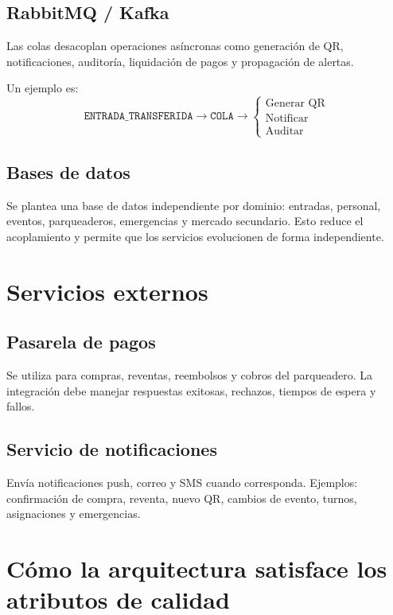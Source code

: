 \documentclass[12pt,a4paper]{article}
\begin{document}
\subsection{RabbitMQ / Kafka}

Las colas desacoplan operaciones asíncronas como generación de QR, notificaciones, auditoría, liquidación de pagos y propagación de alertas.

Un ejemplo es:
\[
\texttt{ENTRADA\_TRANSFERIDA}
\rightarrow
\texttt{COLA}
\rightarrow
\begin{cases}
\text{Generar QR}\\
\text{Notificar}\\
\text{Auditar}
\end{cases}
\]

\subsection{Bases de datos}

Se plantea una base de datos independiente por dominio: entradas, personal, eventos, parqueaderos, emergencias y mercado secundario. Esto reduce el acoplamiento y permite que los servicios evolucionen de forma independiente.

\section{Servicios externos}

\subsection{Pasarela de pagos}

Se utiliza para compras, reventas, reembolsos y cobros del parqueadero. La integración debe manejar respuestas exitosas, rechazos, tiempos de espera y fallos.

\subsection{Servicio de notificaciones}

Envía notificaciones push, correo y SMS cuando corresponda. Ejemplos: confirmación de compra, reventa, nuevo QR, cambios de evento, turnos, asignaciones y emergencias.

\section{Cómo la arquitectura satisface los atributos de calidad}
\label{sec:tacticas-qa}
\end{document}
